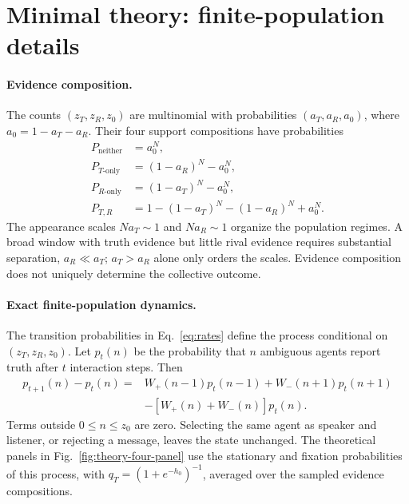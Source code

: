 \section{Minimal theory: finite-population details}
\label{app:minimal-theory}

\paragraph{Evidence composition.}
The counts \((z_T,z_R,z_0)\) are multinomial with probabilities \((a_T,a_R,a_0)\), where \(a_0=1-a_T-a_R\). Their four support compositions have probabilities
\begin{align}
 P_{\mathrm{neither}}&=a_0^N,\nonumber\\
 P_{T\text{-only}}&=(1-a_R)^N-a_0^N,\nonumber\\
 P_{R\text{-only}}&=(1-a_T)^N-a_0^N,\nonumber\\
 P_{T,R}&=1-(1-a_T)^N-(1-a_R)^N+a_0^N.
 \label{eq:evidence-compositions}
\end{align}
The appearance scales \(Na_T\sim1\) and \(Na_R\sim1\) organize the population regimes. A broad window with truth evidence but little rival evidence requires substantial separation, \(a_R\ll a_T\); \(a_T>a_R\) alone only orders the scales. Evidence composition does not uniquely determine the collective outcome.

\paragraph{Exact finite-population dynamics.}
The transition probabilities in Eq.~\eqref{eq:rates} define the process conditional on \((z_T,z_R,z_0)\). Let \(p_t(n)\) be the probability that \(n\) ambiguous agents report truth after \(t\) interaction steps. Then
\begin{align}
 p_{t+1}(n)-p_t(n)
 ={}&W_+(n-1)p_t(n-1)+W_-(n+1)p_t(n+1)\nonumber\\
 &-[W_+(n)+W_-(n)]p_t(n).
 \label{eq:master-equation}
\end{align}
Terms outside \(0\leq n\leq z_0\) are zero. Selecting the same agent as speaker and listener, or rejecting a message, leaves the state unchanged. The theoretical panels in Fig.~\ref{fig:theory-four-panel} use the stationary and fixation probabilities of this process, with \(q_T=(1+e^{-h_0})^{-1}\), averaged over the sampled evidence compositions.

